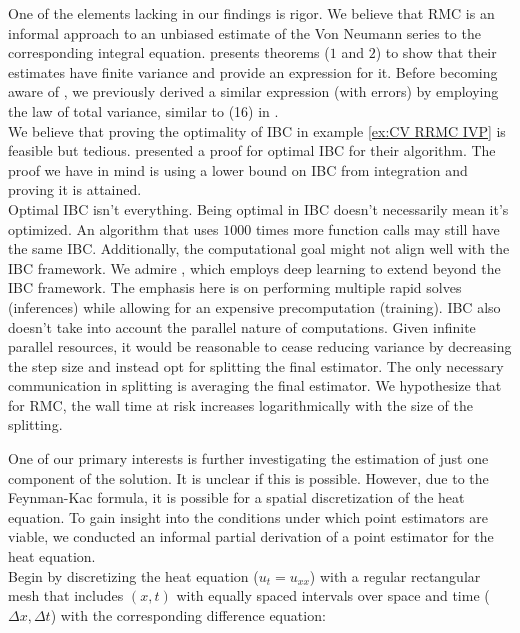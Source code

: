 \documentclass[a4paper,12pt]{article}
\begin{document}
One of the elements lacking in our findings is rigor.  We believe
that RMC is an informal approach to an unbiased estimate of
the Von Neumann series to the corresponding integral equation.
\cite{ermakov_monte_2021} presents theorems ($1$ and $2$) to
show that their estimates have finite variance and provide an expression for it.
Before becoming aware of \cite{ermakov_monte_2021}, we
previously derived a similar expression (with errors)
by employing the law of total variance, similar to (16) in \cite{rath_ears_2022}. \\
We believe that proving the optimality of IBC in example \ref{ex:CV RRMC IVP} is feasible
but tedious.
\cite{daun_randomized_2011} presented a proof for optimal IBC for their algorithm.
The proof we have in mind is using a lower bound on IBC
from integration and proving it is attained.\\

Optimal IBC isn't everything. Being optimal in IBC doesn't necessarily mean it's optimized.
An algorithm that uses $1000$ times more function calls may still have the same
IBC. Additionally, the computational goal
might not align well with the IBC framework.
We admire \cite{becker_learning_2022},
which employs deep learning to extend beyond the IBC framework.
The emphasis here is on performing multiple rapid solves (inferences)
while allowing for an expensive precomputation (training).
IBC also doesn't take into account the parallel nature of computations.
Given infinite parallel resources, it would be reasonable to cease reducing
variance by decreasing the step size and instead opt for splitting the final estimator.
The only necessary communication in splitting is averaging the final
estimator. We hypothesize that for RMC, the wall time at risk
increases logarithmically with the size of the splitting.

One of our primary interests is further investigating the estimation
of just one component of the solution. It is unclear if this is possible.
However, due to the Feynman-Kac formula, it is possible for a spatial
discretization of the heat equation. To gain insight into the conditions under
which point estimators are viable, we conducted an informal partial
derivation of a point estimator for the heat equation.\\


Begin by discretizing the heat equation ($u_{t} = u_{xx}$)
with a regular rectangular mesh that includes $(x,t)$ with equally
spaced intervals over space and time ($\Delta x, \Delta t$) with
the corresponding difference equation:
\end{document}
